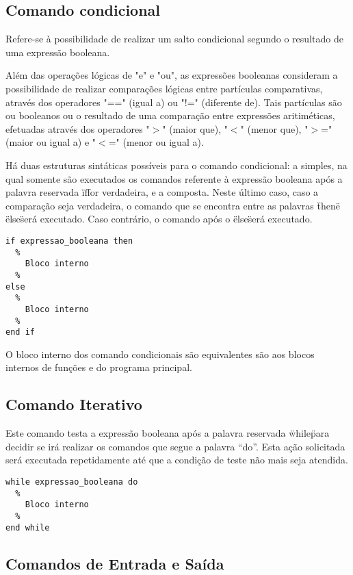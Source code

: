 \documentclass[12pt,oneside,a4paper,english]{abntex2}
\begin{document}
  \subsection{Comando condicional}

  Refere-se à possibilidade de realizar um salto condicional segundo o resultado de uma expressão booleana. 

  Além das operações lógicas de "e" e "ou", as expressões booleanas consideram a possibilidade de realizar comparações lógicas entre partículas comparativas, através dos operadores "==" (igual a) ou "!=" (diferente de). Tais partículas são ou booleanos ou o resultado de uma comparação entre expressões aritiméticas, efetuadas através dos operadores "$>$" (maior que), "$<$" (menor que), "$>$=" (maior ou igual a) e "$<$=" (menor ou igual a).

  Há duas estruturas sintáticas possíveis para o comando condicional: a simples, na qual somente são executados os comandos referente à expressão booleana após a palavra reservada \"if\" for verdadeira, e a composta. Neste último caso, caso a comparação seja verdadeira, o comando que se encontra entre as palavras \"then\" e \"else\" será executado. Caso contrário, o comando após o \"else\" será executado. 

\begin{lstlisting}
if expressao_booleana then
  %
    Bloco interno
  %
else
  %
    Bloco interno
  %
end if
\end{lstlisting}

  O bloco interno dos comando condicionais são equivalentes são aos blocos internos de funções e do programa principal.

  \subsection{Comando Iterativo}

  Este comando testa a expressão booleana após a palavra reservada \"while\" para decidir se irá realizar os comandos que segue a palavra “do”. Esta ação solicitada será executada repetidamente até que a condição de teste não mais seja atendida.           

\begin{lstlisting}
while expressao_booleana do
  %
    Bloco interno
  %
end while
\end{lstlisting}
                             
  \subsection{Comandos de Entrada e Saída}
\end{document}

